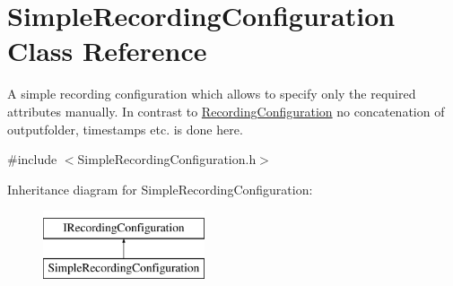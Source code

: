 \hypertarget{class_simple_recording_configuration}{}\section{Simple\+Recording\+Configuration Class Reference}
\label{class_simple_recording_configuration}


A simple recording configuration which allows to specify only the required attributes manually. In contrast to \hyperlink{class_recording_configuration}{Recording\+Configuration} no concatenation of outputfolder, timestamps etc. is done here.  




{\ttfamily \#include $<$Simple\+Recording\+Configuration.\+h$>$}

Inheritance diagram for Simple\+Recording\+Configuration\+:\begin{figure}[H]
\begin{center}
\leavevmode
\includegraphics[height=2.000000cm]{class_simple_recording_configuration}
\end{center}
\end{figure}
